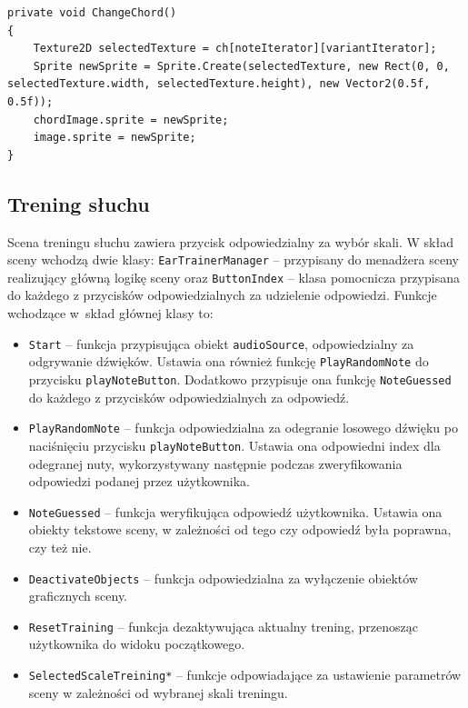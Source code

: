 \begin{lstlisting}[style=sharpcstyle,caption=Funkcja \texttt{ChangeChord}, label=lst:3]
private void ChangeChord()
{
    Texture2D selectedTexture = ch[noteIterator][variantIterator];
    Sprite newSprite = Sprite.Create(selectedTexture, new Rect(0, 0, selectedTexture.width, selectedTexture.height), new Vector2(0.5f, 0.5f));        
    chordImage.sprite = newSprite;        
    image.sprite = newSprite;
}
\end{lstlisting}

\subsection{Trening słuchu}

Scena treningu słuchu zawiera przycisk odpowiedzialny za wybór skali. W skład sceny wchodzą dwie klasy: \texttt{EarTrainerManager} -- przypisany do menadżera sceny realizujący główną logikę sceny oraz \texttt{ButtonIndex} -- klasa pomocnicza przypisana do każdego z przycisków odpowiedzialnych za udzielenie odpowiedzi. Funkcje wchodzące w~skład głównej klasy to:
\begin{itemize}
    \item \texttt{Start} -- funkcja przypisująca obiekt \texttt{audioSource}, odpowiedzialny za odgrywanie dźwięków. Ustawia ona również funkcję \texttt{PlayRandomNote} do przycisku \texttt{playNoteButton}. Dodatkowo przypisuje ona funkcję \texttt{NoteGuessed} do każdego z przycisków odpowiedzialnych za odpowiedź.
    \item \texttt{PlayRandomNote} -- funkcja odpowiedzialna za odegranie losowego dźwięku po naciśnięciu przycisku \texttt{playNoteButton}. Ustawia ona odpowiedni index dla odegranej nuty, wykorzystywany następnie podczas zweryfikowania odpowiedzi podanej przez użytkownika.
    \item \texttt{NoteGuessed} -- funkcja weryfikująca odpowiedź użytkownika. Ustawia ona obiekty tekstowe sceny, w zależności od tego czy odpowiedź była poprawna, czy też nie. 
    \item \texttt{DeactivateObjects} -- funkcja odpowiedzialna za wyłączenie obiektów graficznych sceny.
    \item \texttt{ResetTraining} -- funkcja dezaktywująca aktualny trening, przenosząc użytkownika do widoku początkowego.
    \item \texttt{SelectedScaleTreining*} -- funkcje odpowiadające za ustawienie parametrów sceny w zależności od wybranej skali treningu.
\end{itemize}

